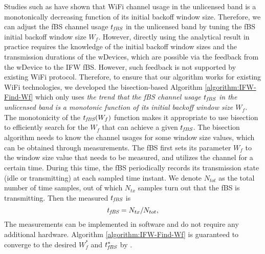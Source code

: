 \documentclass[journal,final,letterpaper,10pt,doublecolumn,twoside]{IEEEtran}
\begin{document}
Studies such as \cite{solve_WiFi_Anomaly_letter_AdjustW} have shown that
WiFi channel usage in the unlicensed band
is a monotonically decreasing function of its initial
backoff window size.
Therefore, we can adjust the fBS channel usage $t_{\emph{fBS}}$ in the unlicensed band by tuning the fBS initial backoff window size $W_f$.
However, directly using the analytical result \cite{solve_WiFi_Anomaly_letter_AdjustW} in practice
 requires the knowledge of the initial
backoff window sizes and the transmission durations of the wDevices, which are possible via the feedback from the wDevice to the IFW fBS. However, such feedback is not supported by existing WiFi protocol. Therefore, to ensure that our algorithm works for existing WiFi technologies, we
developed the bisection-based Algorithm \ref{algorithm:IFW-Find-Wf}
which only uses \emph{the trend that the fBS channel usage $t_{\emph{fBS}}$ in
the unlicensed band is a monotonic function of its initial backoff
window size $W_f$.} The monotonicity of the $t_{\emph{fBS}}(W_f)$ function
makes it appropriate to use bisection
\cite{Computing-textbook-bisection} to efficiently search for the
$W_f$ that can achieve a given $t_{\emph{fBS}}$. The bisection algorithm needs
to know the channel usages for some window size values, which can be
obtained through measurements. The fBS first sets its parameter
$W_f$ to the window size value that needs to be measured, and
utilizes the channel for a certain time. During this time, the fBS
periodically records its transmission state (idle or transmitting)
at each sampled time instant. We denote $N_{tot}$ as the total
number of time samples, out of which $N_{tx}$ samples turn out that
the fBS is transmitting. Then the measured $t_{\emph{fBS}}$ is
\begin{equation}
t_{\emph{fBS}} = N_{tx} / N_{tot} ,  \label{eq:IFW-how-to-measure-tf}
\end{equation}
The measurements can be implemented in software and do not require
any additional hardware. Algorithm \ref{algorithm:IFW-Find-Wf} is
guaranteed to converge to the desired $W_f^*$ and $t_{\emph{fBS}}^*$ by
\cite{Computing-textbook-bisection}.
\end{document}
